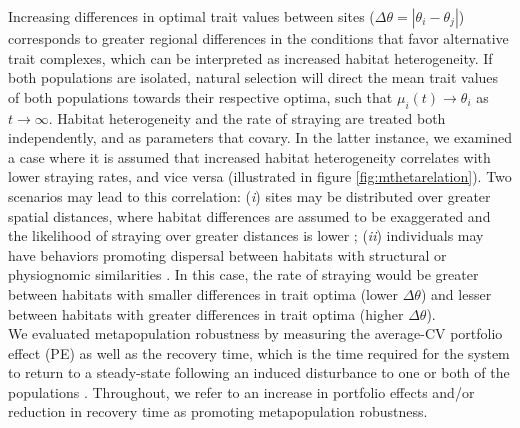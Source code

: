 \documentclass{revtex4}
\begin{document}
\noindent Increasing differences in optimal trait values between sites ($\Delta\theta = \left|\theta_i - \theta_j\right|$) corresponds to greater regional differences in the conditions that favor alternative trait complexes, which can be interpreted as increased habitat heterogeneity.
If both populations are isolated, natural selection will direct the mean trait values of both populations towards their respective optima, such that $\mu_i(t) \rightarrow \theta_i$ as $t\rightarrow\infty$.
Habitat heterogeneity and the rate of straying are treated both independently, and as parameters that covary.
In the latter instance, we examined a case where it is assumed that increased habitat heterogeneity correlates with lower straying rates, and vice versa (illustrated in figure \ref{fig:mthetarelation}).
Two scenarios may lead to this correlation: 
(\emph{i}) sites may be distributed over greater spatial distances, where habitat differences are assumed to be exaggerated and the likelihood of straying over greater distances is lower \citep{Candy:2000hu,JPE:JPE1383};
(\emph{ii}) individuals may have behaviors promoting dispersal between habitats with structural or physiognomic similarities \citep{Peterson:2014gy}.
In this case, the rate of straying would be greater between habitats with smaller differences in trait optima (lower $\Delta\theta$) and lesser between habitats with greater differences in trait optima (higher $\Delta\theta$).
\\


\noindent We evaluated metapopulation robustness by measuring the average-CV portfolio effect (PE) \citep{Anderson:2014cx,Schindler:2015gf} as well as the recovery time, which is the time required for the system to return to a steady-state following an induced disturbance to one or both of the populations \citep{Ovaskainen:2002il}.
Throughout, we refer to an increase in portfolio effects and/or reduction in recovery time as promoting metapopulation robustness.
\end{document}
